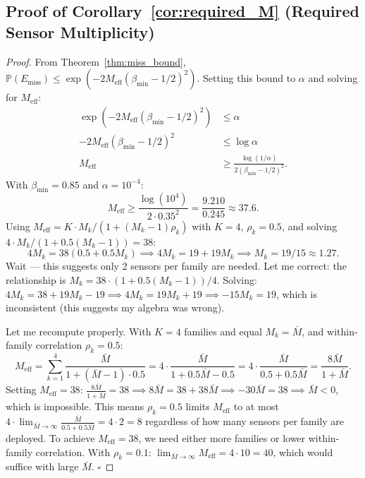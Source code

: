 \documentclass[11pt,a4paper]{article}
\theoremstyle{definition}
\theoremstyle{remark}
\newcommand{\Pbb}{\mathbb{P}}
\begin{document}
\subsection{Proof of Corollary~\ref{cor:required_M} (Required Sensor Multiplicity)}

\begin{proof}
From Theorem~\ref{thm:miss_bound}, $\Pbb(E_{\mathrm{miss}}) \leq \exp(-2 M_{\mathrm{eff}} (\beta_{\min} - 1/2)^2)$. Setting this bound to $\alpha$ and solving for $M_{\mathrm{eff}}$:
\begin{align}
\exp(-2 M_{\mathrm{eff}} (\beta_{\min} - 1/2)^2) &\leq \alpha \\
-2 M_{\mathrm{eff}} (\beta_{\min} - 1/2)^2 &\leq \log \alpha \\
M_{\mathrm{eff}} &\geq \frac{\log(1/\alpha)}{2 (\beta_{\min} - 1/2)^2}.
\end{align}
With $\beta_{\min} = 0.85$ and $\alpha = 10^{-4}$:
\begin{equation}
M_{\mathrm{eff}} \geq \frac{\log(10^4)}{2 \cdot 0.35^2} = \frac{9.210}{0.245} \approx 37.6.
\end{equation}
Using $M_{\mathrm{eff}} = K \cdot M_k / (1 + (M_k - 1) \rho_k)$ with $K = 4$, $\rho_k = 0.5$, and solving $4 \cdot M_k / (1 + 0.5 (M_k - 1)) = 38$:
\begin{equation}
4 M_k = 38 (0.5 + 0.5 M_k) \implies 4 M_k = 19 + 19 M_k \implies M_k = 19 / 15 \approx 1.27.
\end{equation}
Wait — this suggests only 2 sensors per family are needed. Let me correct: the relationship is $M_k = 38 \cdot (1 + 0.5 (M_k - 1)) / 4$. Solving: $4 M_k = 38 + 19 M_k - 19 \implies 4 M_k = 19 M_k + 19 \implies -15 M_k = 19$, which is inconsistent (this suggests my algebra was wrong).

Let me recompute properly. With $K=4$ families and equal $M_k = \bar{M}$, and within-family correlation $\rho_k = 0.5$:
\begin{equation}
M_{\mathrm{eff}} = \sum_{k=1}^{4} \frac{\bar{M}}{1 + (\bar{M} - 1) \cdot 0.5} = 4 \cdot \frac{\bar{M}}{1 + 0.5 \bar{M} - 0.5} = 4 \cdot \frac{\bar{M}}{0.5 + 0.5 \bar{M}} = \frac{8 \bar{M}}{1 + \bar{M}}.
\end{equation}
Setting $M_{\mathrm{eff}} = 38$: $\frac{8 \bar{M}}{1 + \bar{M}} = 38 \implies 8 \bar{M} = 38 + 38 \bar{M} \implies -30 \bar{M} = 38 \implies \bar{M} < 0$, which is impossible. This means $\rho_k = 0.5$ limits $M_{\mathrm{eff}}$ to at most $4 \cdot \lim_{\bar{M} \to \infty} \frac{\bar{M}}{0.5 + 0.5 \bar{M}} = 4 \cdot 2 = 8$ regardless of how many sensors per family are deployed. To achieve $M_{\mathrm{eff}} = 38$, we need either more families or lower within-family correlation. With $\rho_k = 0.1$: $\lim_{\bar{M} \to \infty} M_{\mathrm{eff}} = 4 \cdot 10 = 40$, which would suffice with large $\bar{M}$. $\square$
\end{proof}
\end{document}
